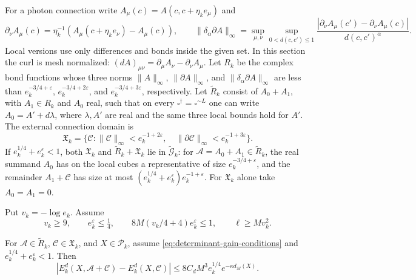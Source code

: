 For a photon connection write $A_\mu(c)=A(c,c+\eta_ke_\mu)$ and
\[
 \partial_\nu A_\mu(c)
       =\eta_k^{-1}(A_\mu(c+\eta_ke_\nu)-A_\mu(c)),\qquad
 \|\delta_\alpha\partial A\|_\infty
       =\sup_{\mu,\nu}\sup_{0<d(c,c')\le1}
          \frac{|\partial_\nu A_\mu(c')-\partial_\nu A_\mu(c)|}
               {d(c,c')^\alpha}.
\]
Local versions use only differences and bonds inside the given set.
In this section the curl is mesh normalized:
$(dA)_{\mu\nu}=\partial_\mu A_\nu-\partial_\nu A_\mu$.
Let $R_k$ be the complex bond functions whose three norms
$\|A\|_\infty$, $\|\partial A\|_\infty$, and
$\|\delta_\alpha\partial A\|_\infty$ are less than
$e_k^{-3/4+\varepsilon}$, $e_k^{-3/4+2\varepsilon}$, and
$e_k^{-3/4+3\varepsilon}$, respectively. Let $\widetilde R_k$
consist of $A_0+A_1$, with $A_1\in R_k$ and $A_0$ real, such that
on every $\square^\dagger=\square^{\sim L}$ one can write
$A_0=A'+d\lambda$, where $\lambda,A'$ are real and the same
three local bounds hold for $A'$. The external connection domain is
\[
 \mathfrak X_k=\{\mathscr C:\|\mathscr C\|_\infty
                  <e_k^{-1+2\varepsilon},\quad
             \|\partial\mathscr C\|_\infty<e_k^{-1+3\varepsilon}\}.
\]
If $e_k^{1/4}+e_k^\varepsilon<1$, both $\mathfrak X_k$ and
$\widetilde R_k+\mathfrak X_k$ lie in
$\widetilde{\mathcal G}_k$: for $\mathscr A=A_0+A_1\in\widetilde R_k$,
the real summand $A_0$ has on the local cubes a representative
of size $e_k^{-3/4+\varepsilon}$, and the remainder
$A_1+\mathscr C$ has size at most
$(e_k^{1/4}+e_k^\varepsilon)e_k^{-1+\varepsilon}$.
For $\mathfrak X_k$ alone take $A_0=A_1=0$.

Put $v_k=-\log e_k$. Assume
\begin{equation}\label{eq:determinant-gain-conditions}
 v_k\ge9,\qquad e_k^\varepsilon\le\tfrac14,\qquad
 8M(v_k/4+4)e_k^\varepsilon\le1,\qquad
 \ell\ge Mv_k^2.
\end{equation}

\begin{proposition}\label{prop:determinant-small-field-gain}
For $\mathscr A\in\widetilde R_k$, $\mathscr C\in\mathfrak X_k$,
and $X\in\mathcal P_k$, assume \eqref{eq:determinant-gain-conditions}
and $e_k^{1/4}+e_k^\varepsilon<1$. Then
\begin{equation}\label{eq:determinant-small-field-gain}
 |E_k^d(X,\mathscr A+\mathscr C)-E_k^d(X,\mathscr C)|
       \le8C_dM^3e_k^{1/4}e^{-\kappa d_M(X)}.
\end{equation}
\end{proposition}

